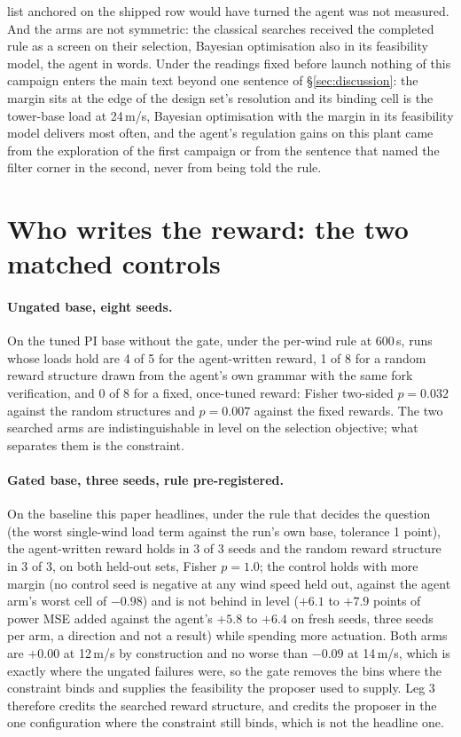 \documentclass{article}
\begin{document}
list anchored on the shipped row would have turned the agent was not measured. And the arms are not symmetric: the classical searches received the completed rule as a screen on their selection, Bayesian optimisation also in its feasibility model, the agent in words. Under the readings fixed before launch nothing of this campaign enters the main text beyond one sentence of §\ref{sec:discussion}: the margin sits at the edge of the design set's resolution and its binding cell is the tower-base load at 24\,m/s, Bayesian optimisation with the margin in its feasibility model delivers most often, and the agent's regulation gains on this plant came from the exploration of the first campaign or from the sentence that named the filter corner in the second, never from being told the rule.

\section{Who writes the reward: the two matched controls}
\label{app:controls}
\paragraph{Ungated base, eight seeds.} On the tuned PI base without the gate, under the per-wind rule at 600\,s, runs whose loads hold are 4 of 5 for the agent-written reward, 1 of 8 for a random reward structure drawn from the agent's own grammar with the same fork verification, and 0 of 8 for a fixed, once-tuned reward: Fisher two-sided $p = 0.032$ against the random structures and $p = 0.007$ against the fixed rewards. The two searched arms are indistinguishable in level on the selection objective; what separates them is the constraint.

\paragraph{Gated base, three seeds, rule pre-registered.} On the baseline this paper headlines, under the rule that decides the question (the worst single-wind load term against the run's own base, tolerance 1 point), the agent-written reward holds in 3 of 3 seeds and the random reward structure in 3 of 3, on both held-out sets, Fisher $p = 1.0$; the control holds with more margin (no control seed is negative at any wind speed held out, against the agent arm's worst cell of $-0.98$) and is not behind in level ($+6.1$ to $+7.9$ points of power MSE added against the agent's $+5.8$ to $+6.4$ on fresh seeds, three seeds per arm, a direction and not a result) while spending more actuation. Both arms are $+0.00$ at 12\,m/s by construction and no worse than $-0.09$ at 14\,m/s, which is exactly where the ungated failures were, so the gate removes the bins where the constraint binds and supplies the feasibility the proposer used to supply. Leg 3 therefore credits the searched reward structure, and credits the proposer in the one configuration where the constraint still binds, which is not the headline one.
\end{document}
